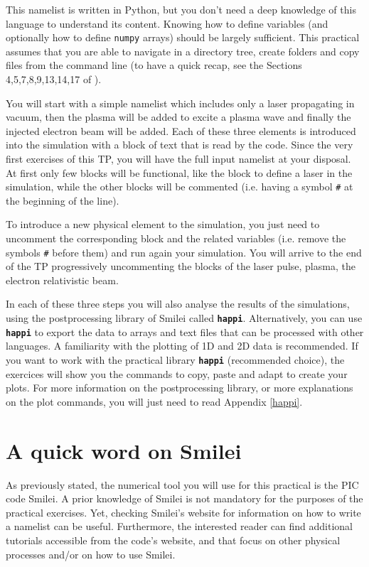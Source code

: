 \documentclass[a4paper,12pt]{extarticle}
\newcommand{\smilei}{{\sc Smilei}\xspace}
\newcommand{\commandline}[1]{\texttt{\textbf{#1}}}
\begin{document}
This namelist is written in Python, but you don't need a deep knowledge of this language to understand its content. Knowing how to define variables (and optionally how to define \texttt{numpy} arrays) should be largely sufficient. This practical assumes that you are able to navigate in a directory tree, create folders and copy files from the command line (to have a quick recap, see the Sections 4,5,7,8,9,13,14,17 of \cite{CommandLineCourse}). 

You will start with a simple namelist which includes only a laser propagating in vacuum, then the plasma will be added to excite a plasma wave and finally the injected electron beam will be added. Each of these three elements is introduced into the simulation with a block of text that is read by the code. Since the very first exercises of this TP, you will have the full input namelist at your disposal. At first only few blocks will be functional, like the block to define a laser in the simulation, while the other blocks will be commented (i.e. having a symbol \texttt{\#} at the beginning of the line).

To introduce a new physical element to the simulation, you just need to uncomment the corresponding block and the related variables (i.e. remove the symbols \texttt{\#} before them) and run  again your simulation. You will arrive to the end of the TP progressively uncommenting the blocks of the laser pulse, plasma, the electron relativistic beam.

In each of these three steps you will also analyse the results of the simulations, using the postprocessing library of \smilei called \commandline{happi}. Alternatively, you can use \commandline{happi} to export the data to arrays and text files that can be processed with other languages.  A familiarity with the plotting of 1D and 2D data is recommended. If you want to work with the practical library \commandline{happi} (recommended choice),  the exercices will show you the commands to copy, paste and adapt to create your plots. For more information on the postprocessing library, or more explanations on the plot commands, you will just need to read Appendix \ref{happi}.

\section*{A quick word on \smilei} %

As previously stated, the numerical tool you will use for this practical is the PIC code \smilei \cite{Smilei2018}. A prior knowledge of \smilei is not mandatory for the purposes of the practical exercises.
Yet, checking \smilei's website for information on how to write a namelist can be useful. 
Furthermore, the interested reader can find additional tutorials accessible from the code's website, and that focus on other physical processes and/or on how to use \smilei.
\end{document}
